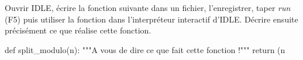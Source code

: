 Ouvrir IDLE, écrire la fonction suivante dans un fichier, l'enregistrer, taper \emph{run} (F5) puis utiliser la fonction dans l'interpréteur interactif d'IDLE. 
Décrire ensuite précisément ce que réalise cette fonction.

\begin{pyverbatim}
def split_modulo(n):
  """A vous de dire ce que fait 
      cette fonction !"""
  return (n%
\end{pyverbatim}
